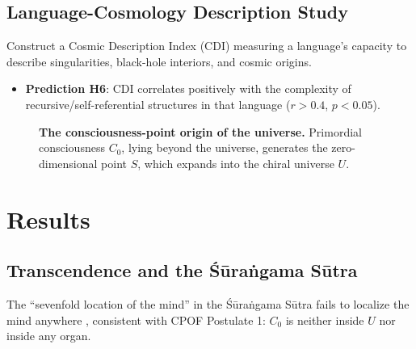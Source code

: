 \documentclass[11pt,a4paper]{article}
\begin{document}
\subsection{Language-Cosmology Description Study}

Construct a Cosmic Description Index (CDI) measuring a language's capacity to describe singularities, black-hole interiors, and cosmic origins.
\begin{itemize}
\item \textbf{Prediction H6}: CDI correlates positively with the complexity of recursive/self-referential structures in that language ($r > 0.4$, $p < 0.05$).
\end{itemize}

\begin{figure}[htbp]
\centering
{}
\caption{\textbf{The consciousness-point origin of the universe.} Primordial consciousness $C_0$, lying beyond the universe, generates the zero-dimensional point $S$, which expands into the chiral universe $U$.}
\label{fig:origin}
\end{figure}

\section{Results}

\subsection{Transcendence and the Śūraṅgama Sūtra}

The ``sevenfold location of the mind'' in the Śūraṅgama Sūtra fails to localize the mind anywhere \cite{surangama}, consistent with CPOF Postulate 1: $C_0$ is neither inside $U$ nor inside any organ.
\end{document}
